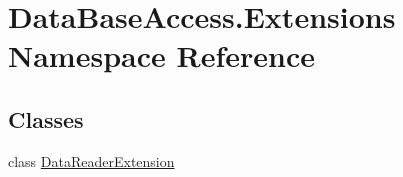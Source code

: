 \hypertarget{namespaceDataBaseAccess_1_1Extensions}{}\section{Data\+Base\+Access.\+Extensions Namespace Reference}
\label{namespaceDataBaseAccess_1_1Extensions}
\subsection*{Classes}
\begin{DoxyCompactItemize}
\item 
class \mbox{\hyperlink{classDataBaseAccess_1_1Extensions_1_1DataReaderExtension}{Data\+Reader\+Extension}}
\end{DoxyCompactItemize}
